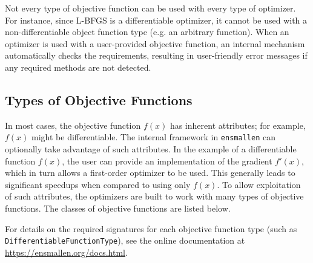 Not every type of objective function can be used with every type of optimizer.
For instance, since L-BFGS is a differentiable optimizer,
it cannot be used with a non-differentiable object function type
(e.g. an arbitrary function).
When an optimizer is used with a user-provided objective function,
an internal mechanism automatically checks the requirements,
resulting in user-friendly error messages if any required methods are not detected.




\subsection{Types of Objective Functions}

In most cases, the objective function $f(x)$ has inherent attributes;
for example, $f(x)$ might be differentiable.
The internal framework in {\tt ensmallen} can optionally take advantage of such attributes.
In the example of a differentiable function $f(x)$,
the user can provide an implementation of the gradient $f'(x)$,
which in turn allows a first-order optimizer to be used.  This generally leads
to significant speedups when compared to using only $f(x)$.
To allow exploitation of such attributes, the optimizers are built to work with
many types of objective functions.  The classes of objective functions
are listed below.

For details on the required signatures for each objective function type
(such as {\tt DifferentiableFunctionType}),
see the online documentation at \mbox{\url{https://ensmallen.org/docs.html}}.


